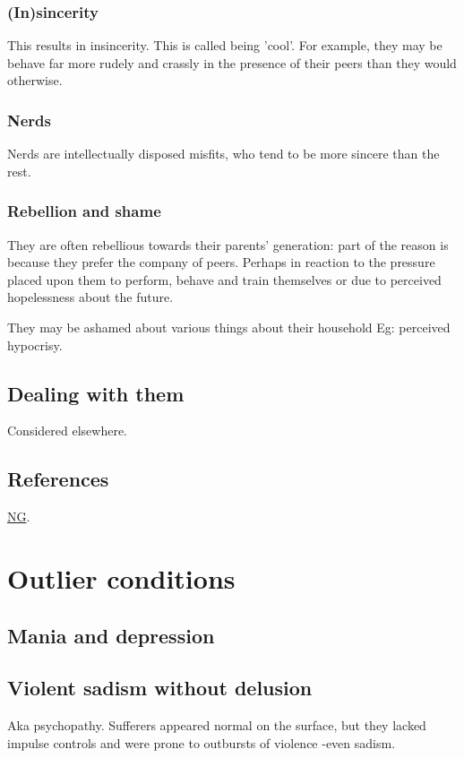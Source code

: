 \documentclass[oneside, article]{memoir}
\begin{document}
\subsubsection{(In)sincerity}
This results in insincerity. This is called being 'cool'. For example, they may be behave far more rudely and crassly in the presence of their peers than they would otherwise. 

\subsubsection{Nerds}
Nerds are intellectually disposed misfits, who tend to be more sincere than the rest.

\subsubsection{Rebellion and shame}
They are often rebellious towards their parents' generation: part of the reason is because they prefer the company of peers. Perhaps in reaction to the pressure placed upon them to perform, behave and train themselves or due to perceived hopelessness about the future.

They may be ashamed about various things about their household Eg: perceived hypocrisy.

\subsection{Dealing with them}
Considered elsewhere.

\subsection{References}
\href{http://ngm.nationalgeographic.com/2011/10/teenage-brains/dobbs-text/1}{NG}.

\section{Outlier conditions}
\subsection{Mania and depression}
\tbc

\subsection{Violent sadism without delusion}
Aka psychopathy. Sufferers appeared normal on the surface, but they lacked impulse controls and were prone to outbursts of violence -even sadism.
\end{document}
